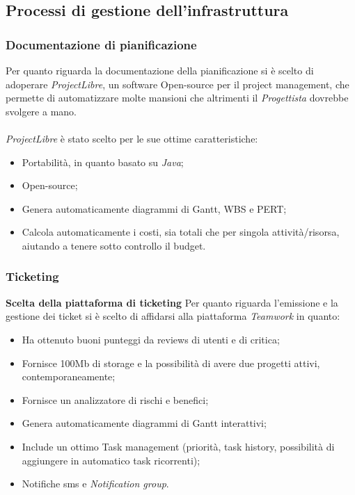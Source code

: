 \documentclass[a4paper]{article}
\begin{document}
	\subsection{Processi di gestione dell'infrastruttura}
	\subsubsection{Documentazione di pianificazione}
		Per quanto riguarda la documentazione della pianificazione si è scelto di adoperare
		\emph{ProjectLibre}, un software Open-source per il project management, che permette
		di automatizzare molte mansioni che altrimenti il \emph{Progettista} dovrebbe svolgere
		a mano. \\ \\
		\emph{ProjectLibre} è stato scelto per le sue ottime caratteristiche:
		\begin{itemize}
			\item Portabilità, in quanto basato su \emph{Java};
			\item Open-source;
			\item Genera automaticamente diagrammi di Gantt, WBS e PERT;
			\item Calcola automaticamente i costi, sia totali che per singola attività/risorsa,
			aiutando a tenere sotto controllo il budget.
		\end{itemize}
	\subsubsection{Ticketing}
	\textbf{Scelta della piattaforma di ticketing}
	Per quanto riguarda l'emissione e la gestione dei ticket si è scelto di affidarsi alla piattaforma \emph{Teamwork}
	in quanto:
	\begin{itemize}
		\item Ha ottenuto buoni punteggi da reviews di utenti e di critica;
		\item Fornisce 100Mb di storage e la possibilità di avere due progetti attivi, contemporaneamente;
		\item Fornisce un analizzatore di rischi e benefici;
		\item Genera automaticamente diagrammi di Gantt interattivi;
		\item Include un ottimo Task management (priorità, task history, possibilità di aggiungere in automatico task ricorrenti);
		\item Notifiche sms e \emph{Notification group}.
	\end{itemize}
\end{document}
